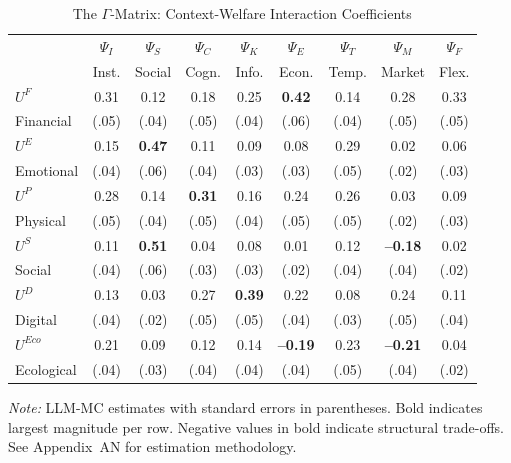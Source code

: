 \begin{table}[htbp]
\centering
\caption{The $\Gamma$-Matrix: Context-Welfare Interaction Coefficients}
\label{tab:gamma-matrix-full}
\small
\begin{tabular}{@{}lcccccccc@{}}
\toprule
& $\Psi_I$ & $\Psi_S$ & $\Psi_C$ & $\Psi_K$ & $\Psi_E$ & $\Psi_T$ & $\Psi_M$ & $\Psi_F$ \\
& \scriptsize{Inst.} & \scriptsize{Social} & \scriptsize{Cogn.} & \scriptsize{Info.} & \scriptsize{Econ.} & \scriptsize{Temp.} & \scriptsize{Market} & \scriptsize{Flex.} \\
\midrule
$U^F$ & 0.31 & 0.12 & 0.18 & 0.25 & \textbf{0.42} & 0.14 & 0.28 & 0.33 \\
\scriptsize{Financial} & \scriptsize{(.05)} & \scriptsize{(.04)} & \scriptsize{(.05)} & \scriptsize{(.04)} & \scriptsize{(.06)} & \scriptsize{(.04)} & \scriptsize{(.05)} & \scriptsize{(.05)} \\
\addlinespace
$U^E$ & 0.15 & \textbf{0.47} & 0.11 & 0.09 & 0.08 & 0.29 & 0.02 & 0.06 \\
\scriptsize{Emotional} & \scriptsize{(.04)} & \scriptsize{(.06)} & \scriptsize{(.04)} & \scriptsize{(.03)} & \scriptsize{(.03)} & \scriptsize{(.05)} & \scriptsize{(.02)} & \scriptsize{(.03)} \\
\addlinespace
$U^P$ & 0.28 & 0.14 & \textbf{0.31} & 0.16 & 0.24 & 0.26 & 0.03 & 0.09 \\
\scriptsize{Physical} & \scriptsize{(.05)} & \scriptsize{(.04)} & \scriptsize{(.05)} & \scriptsize{(.04)} & \scriptsize{(.05)} & \scriptsize{(.05)} & \scriptsize{(.02)} & \scriptsize{(.03)} \\
\addlinespace
$U^S$ & 0.11 & \textbf{0.51} & 0.04 & 0.08 & 0.01 & 0.12 & \textbf{--0.18} & 0.02 \\
\scriptsize{Social} & \scriptsize{(.04)} & \scriptsize{(.06)} & \scriptsize{(.03)} & \scriptsize{(.03)} & \scriptsize{(.02)} & \scriptsize{(.04)} & \scriptsize{(.04)} & \scriptsize{(.02)} \\
\addlinespace
$U^D$ & 0.13 & 0.03 & 0.27 & \textbf{0.39} & 0.22 & 0.08 & 0.24 & 0.11 \\
\scriptsize{Digital} & \scriptsize{(.04)} & \scriptsize{(.02)} & \scriptsize{(.05)} & \scriptsize{(.05)} & \scriptsize{(.04)} & \scriptsize{(.03)} & \scriptsize{(.05)} & \scriptsize{(.04)} \\
\addlinespace
$U^{Eco}$ & 0.21 & 0.09 & 0.12 & 0.14 & \textbf{--0.19} & 0.23 & \textbf{--0.21} & 0.04 \\
\scriptsize{Ecological} & \scriptsize{(.04)} & \scriptsize{(.03)} & \scriptsize{(.04)} & \scriptsize{(.04)} & \scriptsize{(.04)} & \scriptsize{(.05)} & \scriptsize{(.04)} & \scriptsize{(.02)} \\
\bottomrule
\end{tabular}
\begin{flushleft}
\small\textit{Note:} LLM-MC estimates with standard errors in parentheses. 
Bold indicates largest magnitude per row. Negative values in bold indicate 
structural trade-offs. See Appendix~AN for estimation methodology.
\end{flushleft}
\end{table}

